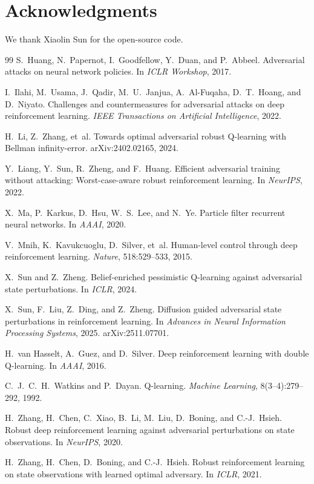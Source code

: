 \documentclass[10pt,twocolumn]{article}
\begin{document}
\section*{Acknowledgments}
We thank Xiaolin Sun for the open-source code.

\begin{thebibliography}{99}
S.~Huang, N.~Papernot, I.~Goodfellow, Y.~Duan, and P.~Abbeel.
Adversarial attacks on neural network policies.
In \emph{ICLR Workshop}, 2017.

I.~Ilahi, M.~Usama, J.~Qadir, M.~U.~Janjua, A.~Al-Fuqaha, D.~T.~Hoang, and D.~Niyato.
Challenges and countermeasures for adversarial attacks on deep reinforcement learning.
\emph{IEEE Transactions on Artificial Intelligence}, 2022.

H.~Li, Z.~Zhang, et~al.
Towards optimal adversarial robust Q-learning with Bellman infinity-error.
arXiv:2402.02165, 2024.

Y.~Liang, Y.~Sun, R.~Zheng, and F.~Huang.
Efficient adversarial training without attacking: Worst-case-aware robust reinforcement learning.
In \emph{NeurIPS}, 2022.

X.~Ma, P.~Karkus, D.~Hsu, W.~S.~Lee, and N.~Ye.
Particle filter recurrent neural networks.
In \emph{AAAI}, 2020.

V.~Mnih, K.~Kavukcuoglu, D.~Silver, et~al.
Human-level control through deep reinforcement learning.
\emph{Nature}, 518:529--533, 2015.

X.~Sun and Z.~Zheng.
Belief-enriched pessimistic Q-learning against adversarial state perturbations.
In \emph{ICLR}, 2024.

X.~Sun, F.~Liu, Z.~Ding, and Z.~Zheng.
Diffusion guided adversarial state perturbations in reinforcement learning.
In \emph{Advances in Neural Information Processing Systems}, 2025.
arXiv:2511.07701.

H.~van Hasselt, A.~Guez, and D.~Silver.
Deep reinforcement learning with double Q-learning.
In \emph{AAAI}, 2016.

C.~J.~C.~H.~Watkins and P.~Dayan.
Q-learning.
\emph{Machine Learning}, 8(3--4):279--292, 1992.

H.~Zhang, H.~Chen, C.~Xiao, B.~Li, M.~Liu, D.~Boning, and C.-J.~Hsieh.
Robust deep reinforcement learning against adversarial perturbations on state observations.
In \emph{NeurIPS}, 2020.

H.~Zhang, H.~Chen, D.~Boning, and C.-J.~Hsieh.
Robust reinforcement learning on state observations with learned optimal adversary.
In \emph{ICLR}, 2021.
\end{thebibliography}
\end{document}
